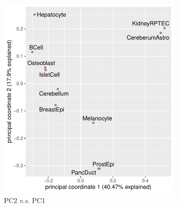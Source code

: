 
\begin{figure}[h!]
  \begin{minipage}[c]{\textwidth}
    \begin{subfigure}{.5\textwidth}
    \centering
    \includegraphics[scale=0.7]{graphics/encode_pca_1_2.pdf}
    \caption{PC2 \textit{v.s.} PC1}
    \end{subfigure}
    ~
    \begin{subfigure}{.5\textwidth}
    \centering

\end{subfigure}
\end{minipage}
\end{figure}
